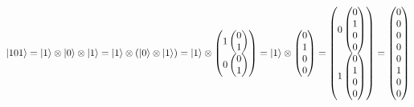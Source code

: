 \documentclass{article}
\DeclarePairedDelimiter\ket{\lvert}{\rangle}
\begin{document}
\(
\ket{101} = 
\ket{1} \otimes \ket{0} \otimes \ket{1} = 
\ket{1} \otimes \left(\ket{0} \otimes \ket{1}\right) =  
\ket{1} \otimes \begin{pmatrix} 1 \begin{pmatrix} 0 \\ 1 \end{pmatrix} \\ 0  \begin{pmatrix} 0 \\ 1 \end{pmatrix} \end{pmatrix} =
\ket{1} \otimes \begin{pmatrix} 0 \\ 1 \\ 0 \\ 0 \end{pmatrix} =
\begin{pmatrix} 0 \begin{pmatrix} 0 \\ 1 \\ 0 \\ 0 \end{pmatrix} \\ 1 \begin{pmatrix} 0 \\ 1 \\ 0 \\ 0 \end{pmatrix} \end{pmatrix} =
\begin{pmatrix} 0 \\ 0 \\ 0 \\ 0 \\ 0 \\ 1 \\ 0 \\ 0 \end{pmatrix}
\)
\end{document}
